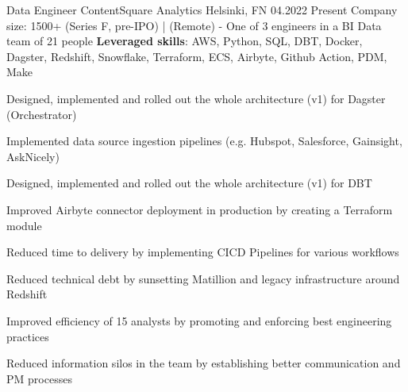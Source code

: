 

\begin{cventries}

\cventry
{Data Engineer} %
{ContentSquare} %
{Analytics} %
{Helsinki, FN} %
{04.2022} %
{Present} %
{Company size: 1500+ (Series F, pre-IPO) | (Remote) - One of 3 engineers in a BI Data team of 21 people} %
{\textbf{Leveraged skills}: AWS, Python, SQL, DBT, Docker, Dagster, Redshift, Snowflake, Terraform, ECS, Airbyte, Github Action, PDM, Make } %
{
  \begin{cvitems} %
    \item {Designed, implemented and rolled out the whole architecture (v1) for Dagster (Orchestrator)}
    \item {Implemented data source ingestion pipelines (e.g. Hubspot, Salesforce, Gainsight, AskNicely)}
    \item {Designed, implemented and rolled out the whole architecture (v1) for DBT}
    \item {Improved Airbyte connector deployment in production by creating a Terraform module}
    \item {Reduced time to delivery by implementing CICD Pipelines for various workflows}
    \item {Reduced technical debt by sunsetting Matillion and legacy infrastructure around Redshift}
    \item {Improved efficiency of 15 analysts by promoting and enforcing best engineering practices }
    \item {Reduced information silos in the team by establishing better communication and PM processes}
  \end{cvitems}
}


\end{cventries}
